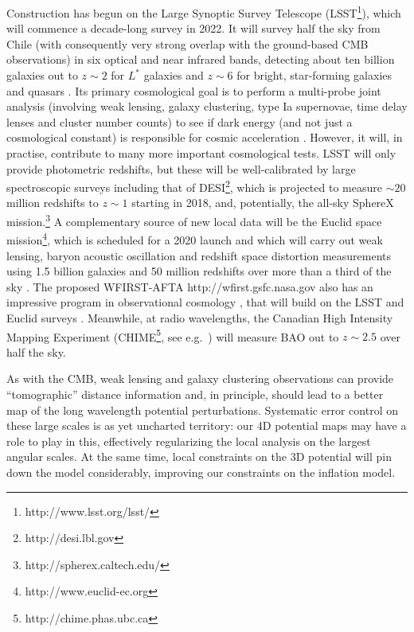 \documentclass[psfig,11pt]{article}
\def\ni{\noindent}
\begin{document}
{\ni{\bf Survey Telescopes:}
Construction has begun on the Large Synoptic Survey Telescope (LSST\footnote{http://www.lsst.org/lsst/}), which will commence a decade-long survey in 2022. It will survey half the sky from Chile (with consequently very strong overlap with the ground-based CMB observations) in six optical and near infrared bands, detecting about ten billion galaxies out to $z\sim2$ for $L^\ast$ galaxies and $z\sim6$ for bright, star-forming galaxies and quasars \cite{LSSTOverviewPaper}. Its primary cosmological goal is to perform a multi-probe joint analysis (involving weak lensing, galaxy clustering, type Ia supernovae, time delay lenses and cluster number counts) to see if dark energy (and not just a cosmological constant) is responsible for cosmic acceleration \cite{LSSTDESCWhitePaper}. However, it  will, in practise, contribute to many more important cosmological tests. LSST will only provide photometric redshifts, but these will be well-calibrated by large spectroscopic surveys including that of DESI\footnote{http://desi.lbl.gov}, which is projected to measure $\sim20$ million redshifts to $z\sim1$ starting in 2018, and, potentially, the all-sky SphereX mission.\footnote{http://spherex.caltech.edu/} A complementary source of new local data will be the Euclid space mission\footnote{http://www.euclid-ec.org}, which is scheduled for a 2020 launch and which will carry out weak lensing, baryon acoustic oscillation and redshift space distortion measurements using 1.5 billion galaxies and 50 million redshifts over more than a third of the sky \cite{EuclidSciBook}. The proposed WFIRST-AFTA {http://wfirst.gsfc.nasa.gov} also has an impressive program in observational cosmology \cite{WFIRSTReport2015}, that will build on the LSST and Euclid surveys \cite{JainEtal2015}. Meanwhile, at radio wavelengths, the Canadian High Intensity Mapping Experiment (CHIME\footnote{http://chime.phas.ubc.ca}, see e.g.\ \cite{CHIME}) will measure BAO out to $z\sim2.5$ over half the sky.

As with the CMB, weak lensing and galaxy clustering observations can provide ``tomographic'' distance information and, in principle, should lead to a better map of the long wavelength potential perturbations. Systematic error control on these large scales is as yet uncharted territory: our 4D potential maps may have a role to play in this, effectively regularizing the local analysis on the largest angular scales. At the same time, local constraints on the 3D potential will pin down the  model considerably, improving our constraints on the inflation model.

}
\end{document}
